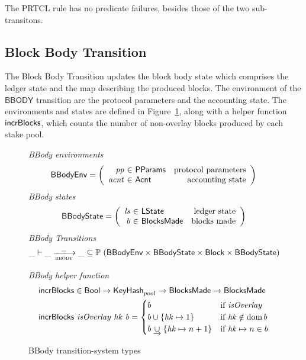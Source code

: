 The PRTCL rule has no predicate failures, besides those of the two sub-transitons.

\clearpage

\subsection{Block Body Transition}
\label{sec:block-body-trans}

The Block Body Transition updates the block body state which comprises the ledger state and the
map describing the produced blocks.
The environment of the $\mathsf{BBODY}$ transition are
the protocol parameters and the accounting state.
The environments and states are defined in Figure~\ref{fig:ts-types:bbody}, along with
a helper function $\mathsf{incrBlocks}$, which counts the number of non-overlay blocks
produced by each stake pool.

\begin{figure}
  \emph{BBody environments}
  \begin{equation*}
    \BBodyEnv =
    \left(
      \begin{array}{r@{~\in~}lr}
        \var{pp} & \PParams & \text{protocol parameters} \\
        \var{acnt} & \Acnt & \text{accounting state}
      \end{array}
    \right)
  \end{equation*}
  \emph{BBody states}
  \begin{equation*}
    \BBodyState =
    \left(
      \begin{array}{r@{~\in~}lr}
        \var{ls} & \LState & \text{ledger state} \\
        \var{b} & \BlocksMade & \text{blocks made} \\
      \end{array}
    \right)
  \end{equation*}
  \emph{BBody Transitions}
  \begin{equation*}
    \_ \vdash \var{\_} \trans{bbody}{\_} \var{\_} \subseteq
    \powerset (\BBodyEnv \times \BBodyState \times \Block \times \BBodyState)
  \end{equation*}
  \caption{BBody transition-system types}
  \label{fig:ts-types:bbody}
  \emph{BBody helper function}
  \begin{align*}
      & \mathsf{incrBlocks} \in \mathsf{Bool} \to \mathsf{KeyHash}_{pool} \to
          \mathsf{BlocksMade} \to \mathsf{BlocksMade} \\
      & \mathsf{incrBlocks}~\mathit{isOverlay}~\mathit{hk}~\mathit{b} =
        \begin{cases}
          b & \text{if }\mathit{isOverlay} \\
          b\cup\{\mathit{hk}\mapsto 1\} & \text{if }\mathit{hk}\notin\operatorname{dom}{b} \\
          b\mathbin{\underrightarrow\cup}\{\mathit{hk}\mapsto n+1\} & \text{if }\mathit{hk}\mapsto n\in b \\
        \end{cases}
  \end{align*}

\end{figure}

